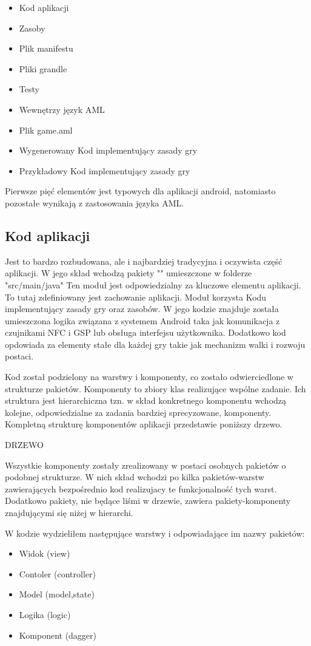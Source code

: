 \documentclass	{xmgr}
\begin{document}
\begin{itemize}
	\item Kod aplikacji
	\item Zasoby
	\item Plik manifestu
	\item Pliki grandle
	\item Testy
	\item Wewnętrzy język AML
	\item Plik game.aml
	\item Wygenerowany Kod implementujący zasady gry
	\item Przykładowy Kod implementujący zasady gry
\end{itemize}

Pierwsze pięć elementów jest typowych dla aplikacji android, natomiasto pozostałe wynikają z zastosowania języka AML.

\subsection{Kod aplikacji} 
Jest to bardzo rozbudowana, ale i najbardziej tradycyjna i oczywista część aplikacji. W jego skład wchodzą pakiety "" umieszczone w folderze "src/main/java"
Ten moduł jest odpowiedzialny za kluczowe elementu aplikacji. To tutaj zdefiniowany jest zachowanie aplikacji. Moduł korzysta Kodu implementujący zasady gry oraz zasobów. W jego kodzie znajduje została umieszczona logika związana z systemem Android taka jak  komunikacja z czujnikami NFC i GSP lub obsługa interfejsu użytkownika. Dodatkowo kod opdowiada za elementy stałe dla każdej gry takie jak mechanizm walki i rozwoju postaci.

Kod został podzielony na warstwy i komponenty, co zostało odwierciedlone w strukturze pakietów. 
Komponenty to zbiory klas realizujące wspólne zadanie. Ich struktura jest hierarchiczna tzn. w skład konkretnego komponentu wchodzą kolejne, odpowiedzialne za zadania bardziej sprecyzowane, komponenty. Kompletną strukturę komponentów aplikacji przedstawie poniższy drzewo.

DRZEWO

Wszystkie komponenty zostały zrealizowany w postaci osobnych pakietów o podobnej strukturze. W nich skład wchodzi po kilka pakietów-warstw zawierających bezpośrednio kod realizujacy te funkcjonalność tych warst. Dodatkowo pakiety, nie będące liśmi w drzewie, zawiera pakiety-komponenty znajdującymi się niżej w hierarchi.

W kodzie wydzieliłem następujące warstwy i odpowiadające im nazwy pakietów:
\begin{itemize}
	\item Widok (view)
	\item Contoler (controller)
	\item Model (model,state)
	\item Logika (logic)
	\item Komponent (dagger)
\end{itemize}
\end{document}

